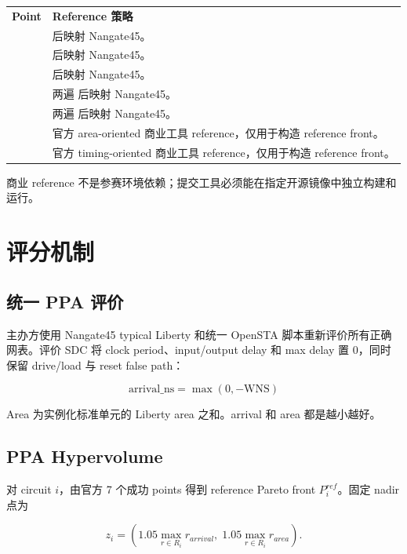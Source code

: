 \documentclass[UTF8,a4paper,11pt,fontset=fandol]{ctexart}
\begin{document}
\begin{table}[H]
\centering
\small
\begin{tabularx}{\textwidth}{p{}Y}
\bfseries Point & \bfseries Reference 策略 \\
 &  后映射 Nangate45。 \\
 &  后映射 Nangate45。 \\
 &  后映射 Nangate45。 \\
 & 两遍  后映射 Nangate45。 \\
 & 两遍  后映射 Nangate45。 \\
 & 官方 area-oriented 商业工具 reference，仅用于构造 reference front。 \\
 & 官方 timing-oriented 商业工具 reference，仅用于构造 reference front。 \\
\end{tabularx}
\end{table}

商业 reference 不是参赛环境依赖；提交工具必须能在指定开源镜像中独立构建和运行。

\section{评分机制}

\subsection{统一 PPA 评价}

主办方使用 Nangate45 typical Liberty 和统一 OpenSTA 脚本重新评价所有正确网表。评价 SDC 将 clock period、input/output delay 和 max delay 置 0，同时保留 drive/load 与 reset false path：

\[
  \mathrm{arrival\_ns}=\max(0,-\mathrm{WNS})
\]

Area 为实例化标准单元的 Liberty area 之和。arrival 和 area 都是越小越好。

\subsection{PPA Hypervolume}

对 circuit \(i\)，由官方 7 个成功 points 得到 reference Pareto front \(P_i^{ref}\)。固定 nadir 点为

\[
z_i=\left(1.05\max_{r\in R_i}r_{arrival},\;1.05\max_{r\in R_i}r_{area}\right).
\]
\end{document}
